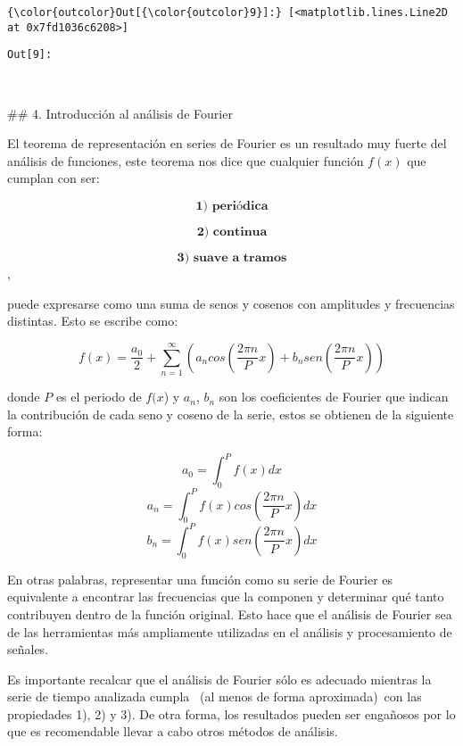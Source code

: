 \documentclass[11pt]{article}
\begin{document}
\begin{Verbatim}[commandchars=\\\{\}]
{\color{outcolor}Out[{\color{outcolor}9}]:} [<matplotlib.lines.Line2D at 0x7fd1036c6208>]
\end{Verbatim}
            \texttt{\color{outcolor}Out[{\color{outcolor}9}]:}
    
    \begin{center}
    \end{center}
    { \hspace*{\fill} \\}
    

     \#\# 4. Introducción al análisis de Fourier

El teorema de representación en series de Fourier es un resultado muy
fuerte del análisis de funciones, este teorema nos dice que cualquier
función \(f(x)\) que cumplan con ser:

\[\textbf{1) periódica}\]

\[\textbf{2) continua}\]

\[\textbf{3) suave a tramos}\],

puede expresarse como una suma de senos y cosenos con amplitudes y
frecuencias distintas. Esto se escribe como:

\[ f(x) = \frac{a_{0}}{2} + {{\sum_{n=1}^\infty(a_{n}  cos(\frac{2\pi n}{P}x) + b_{n}  sen(\frac{2\pi n}{P}x) ) }} \]

donde \(P\) es el periodo de \(f(x\)) y \(a_{n}\), \(b_{n}\) son los
coeficientes de Fourier que indican la contribución de cada seno y
coseno de la serie, estos se obtienen de la siguiente forma:

\[ a_{0} = \int_{0}^{P} f(x)   dx  \]
\[ a_{n} = \int_{0}^{P} f(x) cos(\frac{2\pi n}{P}x) dx  \]
\[ b_{n} = \int_{0}^{P} f(x) sen(\frac{2\pi n}{P}x) dx  \]

En otras palabras, representar una función como su serie de Fourier es
equivalente a encontrar las frecuencias que la componen y determinar qué
tanto contribuyen dentro de la función original. Esto hace que el
análisis de Fourier sea de las herramientas más ampliamente utilizadas
en el análisis y procesamiento de señales.

Es importante recalcar que el análisis de Fourier sólo es adecuado
mientras la serie de tiempo analizada cumpla ~(al menos de forma
aproximada)~con las propiedades 1), 2) y 3). De otra forma, los
resultados pueden ser engañosos por lo que es recomendable llevar a cabo
otros métodos de análisis.
\end{document}

